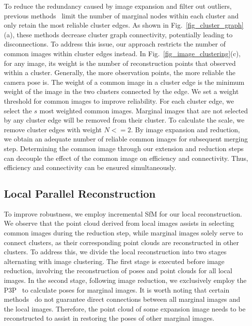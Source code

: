\documentclass[runningheads]{llncs}
\begin{document}
To reduce the redundancy caused by image expansion and filter out outliers, previous methods~\cite{gsfm,AccPara,AdaSfM} limit the number of marginal nodes within each cluster and only retain the most reliable cluster edges. As shown in Fig.~\ref{fig_cluster_graph}(a), these methods decrease cluster graph connectivity, potentially leading to disconnections. To address this issue, our approach restricts the number of common images within cluster edges instead. In Fig.~\ref{fig_image_clustering}(c), for any image, its weight is the number of reconstruction points that observed within a cluster. Generally, the more observation points, the more reliable the camera pose is. The weight of a common image in a cluster edge is the minimum weight of the image in the two clusters connected by the edge. We set a weight threshold for common images to improve reliability. For each cluster edge, we select the $s$ most weighted common images. Marginal images that are not selected by any cluster edge will be removed from their cluster. To calculate the scale, we remove cluster edges with weight $N<=2$. By image expansion and reduction, we obtain an adequate number of reliable common images for subsequent merging step. Determining the common image through our extension and reduction steps can decouple the effect of the common image on efficiency and connectivity. Thus, efficiency and connectivity can be ensured simultaneously.

\subsection{Local Parallel Reconstruction}
To improve robustness, we employ incremental SfM for our local reconstruction. We observe that the point cloud derived from local images assists in selecting common images during the reduction step, while marginal images solely serve to connect clusters, as their corresponding point clouds are reconstructed in other clusters. To address this, we divide the local reconstruction into two stages alternating with image clustering. The first stage is executed before image reduction, involving the reconstruction of poses and point clouds for all local images. In the second stage, following image reduction, we exclusively employ the P3P~\cite{P3P} to calculate poses for marginal images. It is worth noting that certain methods~\cite{AccPara,AdaSfM} do not guarantee direct connections between all marginal images and the local images. Therefore, the point cloud of some expansion image needs to be reconstructed to assist in restoring the poses of other marginal images. 
\end{document}
